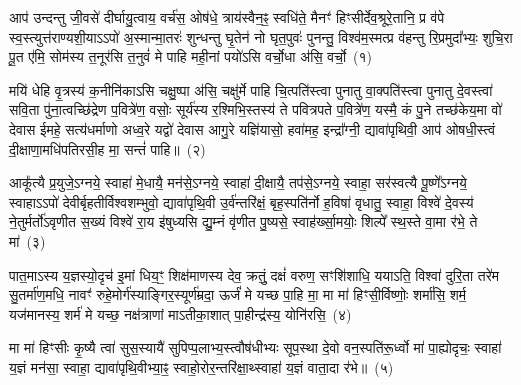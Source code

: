 {\anuvakamend[{जु॒षेथा॒मा स नो॑ यजा॒दा त्रयो॑विꣳशतिश्च}]}

{\prashnaend[{इ॒षे त्वा॑ य॒ज्ञस्य॒ शुन्ध॑ध्वं॒ कर्म॑णे दे॒वो\-ऽव॑धूत॒न्धृष्टिः॒ सं व॑पा॒म्या द॑दे॒
प्रत्यु॑ष्टं॒ कृष्णो॑\-ऽसि॒ भुव॑नमसि॒ वाज॑स्यो॒भा वां॒ चतु॑र्दश॥14॥ इ॒षे दृꣳ॑ह॒ भुव॑नम॒ष्टाविꣳ॑शतिः॥28॥ इ॒षे त्वा॑ क॒ल्पया॑ति॥}]}


\setcounter{anuvakam}{0}
आप॑ उन्दन्तु जी॒वसे॑ दीर्घायु॒त्वाय॒ वर्च॑स॒ ओष॑धे॒ त्राय॑स्वैन॒ꣴ॒ स्वधि॑ते॒ मैनꣳ॑ हिꣳसीर्देव॒श्रूरे॒तानि॒ प्र व॑पे स्व॒स्त्युत्त॑राण्यशी॒या\-ऽ\-ऽपो॑ अ॒स्मान्मा॒तरः॑ शुन्धन्तु घृ॒तेन॑ नो घृत॒पुवः॑ पुनन्तु॒ विश्व॑म॒स्मत्प्र व॑हन्तु रि॒प्रमुदा᳚भ्यः॒ शुचि॒रा पू॒त ए॑मि॒ सोम॑स्य त॒नूर॑सि त॒नुवं॑ मे पाहि मही॒नां पयो॑\-ऽसि वर्चो॒धा अ॑सि॒ वर्चो॒~(१)

मयि॑ धेहि वृ॒त्रस्य॑ क॒नीनि॑का\-ऽसि चक्षु॒ष्पा अ॑सि॒ चक्षु॑र्मे पाहि चि॒त्पति॑स्त्वा पुनातु वा॒क्पति॑स्त्वा पुनातु दे॒वस्त्वा॑ सवि॒ता पु॑ना॒त्वच्छि॑द्रेण प॒वित्रे॑ण॒ वसोः॒ सूर्य॑स्य र॒श्मिभि॒स्तस्य॑ ते पवित्रपते प॒वित्रे॑ण॒ यस्मै॒ कं पु॒ने तच्छ॑केय॒मा वो॑ देवास ईमहे॒ सत्य॑धर्माणो अध्व॒रे यद्वो॑ देवास आगु॒रे यज्ञि॑यासो॒ हवा॑मह॒ इन्द्रा᳚ग्नी॒ द्यावा॑पृथिवी॒ आप॑ ओषधी॒स्त्वं दी॒क्षाणा॒मधि॑पतिरसी॒ह मा॒ सन्तं॑ पाहि॥~(२)

{\anuvakamend[{वर्च॑ ओषधीर॒ष्टौ च॑}]}%

आकू᳚त्यै प्र॒युजे॒\-ऽग्नये॒ स्वाहा॑ मे॒धायै॒ मन॑से॒\-ऽग्नये॒ स्वाहा॑ दी॒क्षायै॒ तप॑से॒\-ऽग्नये॒ स्वाहा॒ सर॑स्वत्यै पू॒ष्णे᳚\-ऽग्नये॒ स्वाहा\-ऽ\-ऽपो॑ देवीर्बृहतीर्विश्वशम्भुवो॒ द्यावा॑पृथि॒वी उ॒र्व॑न्तरि॑क्षं॒ बृह॒स्पति॑र्नो ह॒विषा॑ वृधातु॒ स्वाहा॒ विश्वे॑ दे॒वस्य॑ ने॒तुर्मर्तो॑\-ऽवृणीत स॒ख्यं विश्वे॑ रा॒य इ॑षुध्यसि द्यु॒म्नं वृ॑णीत पु॒ष्यसे॒ स्वाह॑र्ख्सा॒मयोः॒ शिल्पे᳚ स्थ॒स्ते वा॒मा र॑भे॒ ते मा॑~(३)

पात॒मा\-ऽस्य य॒ज्ञस्यो॒दृच॑ इ॒मां धिय॒ꣳ॒ शिक्ष॑माणस्य देव॒ क्रतुं॒ दक्षं॑ वरुण॒ सꣳशि॑शाधि॒ यया\-ऽति॒ विश्वा॑ दुरि॒ता तरे॑म सु॒तर्मा॑ण॒मधि॒ नावꣳ॑ रुहे॒मोर्ग॑स्याङ्गिर॒स्यूर्ण॑म्रदा॒ ऊर्जं॑ मे यच्छ पा॒हि मा॒ मा मा॑ हिꣳसी॒र्विष्णोः॒ शर्मा॑सि॒ शर्म॒ यज॑मानस्य॒ शर्म॑ मे यच्छ॒ नक्ष॑त्राणां मा\-ऽतीका॒शात् पा॒हीन्द्र॑स्य॒ योनि॑रसि॒~(४)

मा मा॑ हिꣳसीः कृ॒ष्यै त्वा॑ सुस॒स्यायै॑ सुपिप्प॒लाभ्य॒स्त्वौष॑\-धीभ्यः सूप॒स्था दे॒वो वन॒स्पति॑रू॒र्ध्वो मा॑ पा॒ह्योदृचः॒ स्वाहा॑ य॒ज्ञं मन॑सा॒ स्वाहा॒ द्यावा॑पृथि॒वीभ्या॒ꣴ॒ स्वाहो॒रोर॒न्तरि॑क्षा॒थ्स्वाहा॑ य॒ज्ञं वाता॒दा र॑भे॥~(५)

